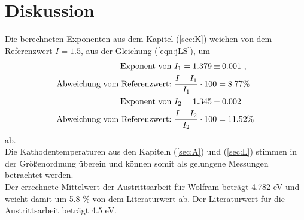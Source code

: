 \section{Diskussion}
\label{sec:Diskussion}

Die berechneten Exponenten aus dem Kapitel (\ref{sec:K}) weichen von dem Referenzwert $I = 1.5$, aus der Gleichung (\ref{eqn:jLS}), um
\begin{align*}
  \text{Exponent von}\ & I_1 = \num{1.379 +- 0.001} \ , \\
  \text{Abweichung vom Referenzwert:}\ & \frac{I - I_1}{I_1} \cdot 100 = 8.77\% \\
  \text{Exponent von}\ & I_2 = \num{1.345 +- 0.002} \\
  \text{Abweichung vom Referenzwert:}\ & \frac{I - I_2}{I_2} \cdot 100 = 11.52\%
\end{align*}
ab. \\
Die Kathodentemperaturen aus den Kapiteln (\ref{sec:A}) und (\ref{sec:L}) stimmen in der Größenordnung überein und können somit als gelungene Messungen betrachtet werden. \\
Der errechnete Mittelwert der Austrittsarbeit für Wolfram beträgt 4.782 eV und weicht damit um 5.8 \% von dem Literaturwert ab. Der Literaturwert für die Austrittsarbeit beträgt 4.5 eV.
